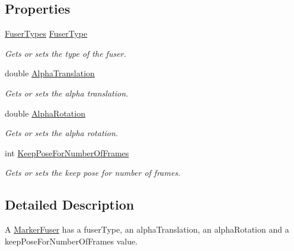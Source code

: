 \subsection*{Properties}
\begin{DoxyCompactItemize}
\item 
\hyperlink{class_a_rdev_kit_1_1_model_1_1_project_1_1_marker_fuser_a27640545baec2d64d0cc55af7818a6eb}{Fuser\-Types} \hyperlink{class_a_rdev_kit_1_1_model_1_1_project_1_1_marker_fuser_af2d47a34650e67792191c3d2553aae3f}{Fuser\-Type}
\begin{DoxyCompactList}\small\item\em Gets or sets the type of the fuser. \end{DoxyCompactList}\item 
double \hyperlink{class_a_rdev_kit_1_1_model_1_1_project_1_1_marker_fuser_ac5342436a234bcd887fc29684e771228}{Alpha\-Translation}
\begin{DoxyCompactList}\small\item\em Gets or sets the alpha translation. \end{DoxyCompactList}\item 
double \hyperlink{class_a_rdev_kit_1_1_model_1_1_project_1_1_marker_fuser_a7d1706b92cf1407de2b40183057642d3}{Alpha\-Rotation}
\begin{DoxyCompactList}\small\item\em Gets or sets the alpha rotation. \end{DoxyCompactList}\item 
int \hyperlink{class_a_rdev_kit_1_1_model_1_1_project_1_1_marker_fuser_abe44b1d8d25a194883d2d676ab020f23}{Keep\-Pose\-For\-Number\-Of\-Frames}
\begin{DoxyCompactList}\small\item\em Gets or sets the keep pose for number of frames. \end{DoxyCompactList}\end{DoxyCompactItemize}


\subsection{Detailed Description}
A \hyperlink{class_a_rdev_kit_1_1_model_1_1_project_1_1_marker_fuser}{Marker\-Fuser} has a fuser\-Type, an alpha\-Translation, an alpha\-Rotation and a keep\-Pose\-For\-Number\-Of\-Frames value. 

